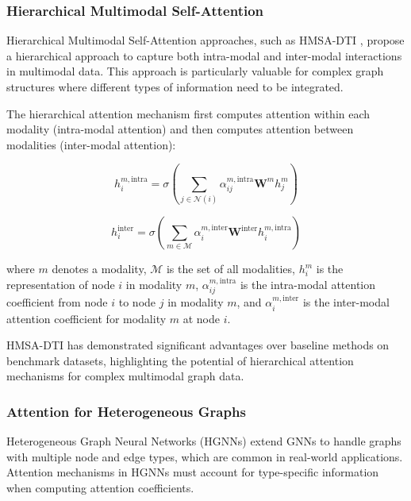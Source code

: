 \documentclass{article}
\begin{document}
\subsubsection{Hierarchical Multimodal Self-Attention}

Hierarchical Multimodal Self-Attention approaches, such as HMSA-DTI \cite{ji2024hierarchical}, propose a hierarchical approach to capture both intra-modal and inter-modal interactions in multimodal data. This approach is particularly valuable for complex graph structures where different types of information need to be integrated.

The hierarchical attention mechanism first computes attention within each modality (intra-modal attention) and then computes attention between modalities (inter-modal attention):

\begin{equation}
h_i^{m, \text{intra}} = \sigma\left(\sum_{j \in \mathcal{N}(i)} \alpha_{ij}^{m, \text{intra}} \mathbf{W}^m h_j^m\right)
\end{equation}

\begin{equation}
h_i^{\text{inter}} = \sigma\left(\sum_{m \in \mathcal{M}} \alpha_i^{m, \text{inter}} \mathbf{W}^{\text{inter}} h_i^{m, \text{intra}}\right)
\end{equation}

where $m$ denotes a modality, $\mathcal{M}$ is the set of all modalities, $h_i^m$ is the representation of node $i$ in modality $m$, $\alpha_{ij}^{m, \text{intra}}$ is the intra-modal attention coefficient from node $i$ to node $j$ in modality $m$, and $\alpha_i^{m, \text{inter}}$ is the inter-modal attention coefficient for modality $m$ at node $i$.

HMSA-DTI has demonstrated significant advantages over baseline methods on benchmark datasets, highlighting the potential of hierarchical attention mechanisms for complex multimodal graph data.

\subsubsection{Attention for Heterogeneous Graphs}

Heterogeneous Graph Neural Networks (HGNNs) extend GNNs to handle graphs with multiple node and edge types, which are common in real-world applications. Attention mechanisms in HGNNs must account for type-specific information when computing attention coefficients.
\end{document}
